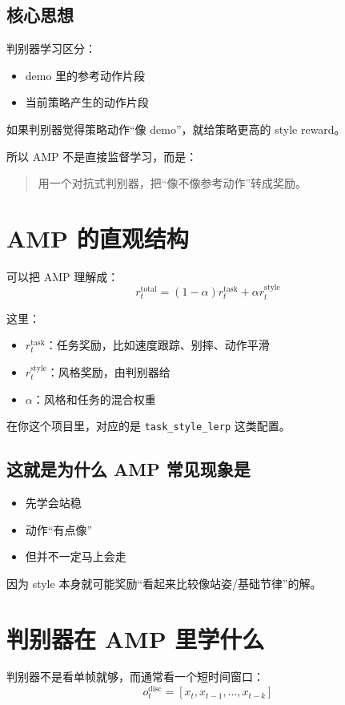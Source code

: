 \documentclass[11pt,a4paper]{article}
\begin{document}
\subsection{核心思想}
判别器学习区分：
\begin{itemize}
\item demo 里的参考动作片段
\item 当前策略产生的动作片段
\end{itemize}

如果判别器觉得策略动作“像 demo”，就给策略更高的 style reward。

所以 AMP 不是直接监督学习，而是：
\begin{quote}
用一个对抗式判别器，把“像不像参考动作”转成奖励。
\end{quote}

\section{AMP 的直观结构}
可以把 AMP 理解成：
\[
r_t^{\text{total}}
=
(1-\alpha)r_t^{\text{task}}
+
\alpha r_t^{\text{style}}
\]

这里：
\begin{itemize}
\item $r_t^{\text{task}}$：任务奖励，比如速度跟踪、别摔、动作平滑
\item $r_t^{\text{style}}$：风格奖励，由判别器给
\item $\alpha$：风格和任务的混合权重
\end{itemize}

在你这个项目里，对应的是 \texttt{task\_style\_lerp} 这类配置。

\subsection{这就是为什么 AMP 常见现象是}
\begin{itemize}
\item 先学会站稳
\item 动作“有点像”
\item 但并不一定马上会走
\end{itemize}

因为 style 本身就可能奖励“看起来比较像站姿/基础节律”的解。

\section{判别器在 AMP 里学什么}
判别器不是看单帧就够，而通常看一个短时间窗口：
\[
o_t^{\text{disc}} = [x_t, x_{t-1}, \dots, x_{t-k}]
\]
\end{document}
